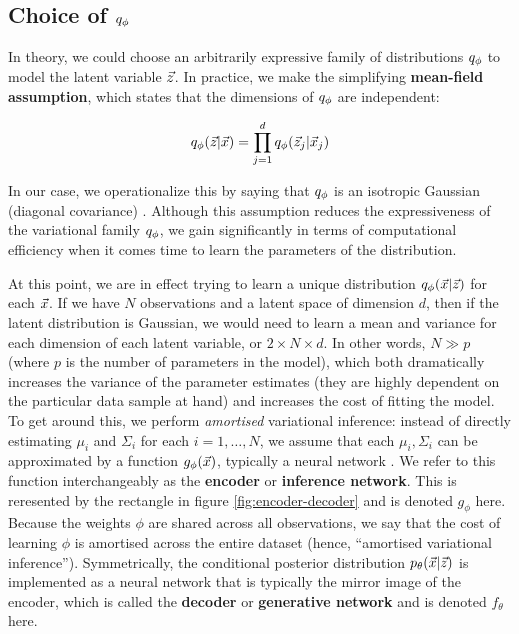 \subsection{Choice of $q_\phi$}

In theory, we could choose an arbitrarily expressive family of distributions $q_\phi$ to model the latent variable $\vec{z}$. In practice, we make the simplifying {\bf mean-field assumption}, which states that the dimensions of $q_\phi$ are independent:

\begin{align*}
    q_\phi(\vec{z}|\vec{x}) = \prod_{j=1}^dq_\phi(\vec{z}_j|\vec{x}_j)
\end{align*}

In our case, we operationalize this by saying that $q_\phi$ is an isotropic Gaussian (diagonal covariance) \cite{blei2011}. Although this assumption reduces the expressiveness of the variational family $q_\phi$, we gain significantly in terms of computational efficiency when it comes time to learn the parameters of the distribution.

At this point, we are in effect trying to learn a unique distribution $q_\phi(\vec{x}|\vec{z})$ for each $\vec{x}$. If we have $N$ observations and a latent space of dimension $d$, then if the latent distribution is Gaussian, we would need to learn a mean and variance for each dimension of each latent variable, or $2\times N \times d$. In other words, $N\gg p$ (where $p$ is the number of parameters in the model), which both dramatically increases the variance of the parameter estimates (they are highly dependent on the particular data sample at hand) and increases the cost of fitting the model. To get around this, we perform {\it amortised} variational inference: instead of directly estimating $\mu_i$ and $\Sigma_i$ for each $i = 1, \dots, N$, we assume that each $\mu_i, \Sigma_i$ can be approximated by a function $g_\phi(\vec{x})$, typically a neural network \cite{jaanTutorial}. We refer to this function interchangeably as the {\bf encoder} or {\bf inference network}. This is reresented by the rectangle in figure \ref{fig:encoder-decoder} and is denoted $g_\phi$ here. Because the weights $\phi$ are shared across all observations, we say that the cost of learning $\phi$ is amortised across the entire dataset (hence, ``amortised variational inference''). Symmetrically, the conditional posterior distribution $p_\theta(\vec{x}|\vec{z})$ is implemented as a neural network that is typically the mirror image of the encoder, which is called the {\bf decoder} or {\bf generative network} and is denoted $f_\theta$ here.

